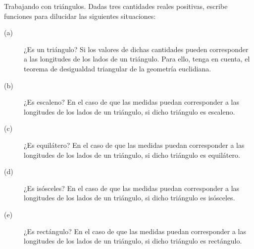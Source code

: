 \documentclass{article}
\begin{document}
\begin{ej}
Trabajando con triángulos. Dadas tres cantidades reales positivas, escribe funciones para dilucidar las siguientes situaciones:
\begin{description}
\item[(a)] ¿Es un triángulo? Si los valores de dichas cantidades pueden corresponder a las longitudes de los lados de un triángulo. Para ello, tenga en cuenta, el teorema de desigualdad triangular de la geometría euclidiana.
\item[(b)] ¿Es escaleno? En el caso de que las medidas puedan corresponder a las longitudes de los lados de un triángulo, si dicho triángulo es escaleno.
\item[(c)] ¿Es equilátero? En el caso de que las medidas puedan corresponder a las longitudes de los lados de un triángulo, si dicho triángulo es equilátero.
\item[(d)] ¿Es isósceles? En el caso de que las medidas puedan corresponder a las longitudes de los lados de un triángulo, si dicho triángulo es isósceles.
\item[(e)] ¿Es rectángulo? En el caso de que las medidas puedan corresponder a las longitudes de los lados de un triángulo, si dicho triángulo es rectángulo.
\end{description}
\end{ej}
\end{document}
